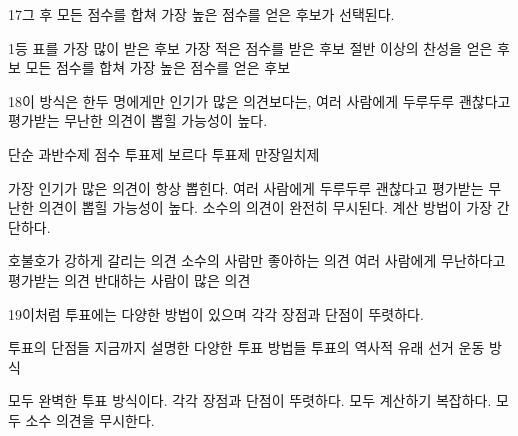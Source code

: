 \documentclass[fs85,seriesRus]{korfarm-base}
\begin{document}
\begin{kfSentenceUnit}{17}{그 후 모든 점수를 합쳐 가장 높은 점수를 얻은 후보가 선택된다.}
\begin{kfChoices}
\kfChoice 1등 표를 가장 많이 받은 후보
\kfChoice 가장 적은 점수를 받은 후보
\kfChoice 절반 이상의 찬성을 얻은 후보
\kfChoice 모든 점수를 합쳐 가장 높은 점수를 얻은 후보
\end{kfChoices}
\end{kfSentenceUnit}

\begin{kfSentenceUnit}{18}{이 방식은 한두 명에게만 인기가 많은 의견보다는, 여러 사람에게 두루두루 괜찮다고 평가받는 무난한 의견이 뽑힐 가능성이 높다.}
\begin{kfChoices}
\kfChoice 단순 과반수제
\kfChoice 점수 투표제
\kfChoice 보르다 투표제
\kfChoice 만장일치제
\end{kfChoices}
\begin{kfChoices}
\kfChoice 가장 인기가 많은 의견이 항상 뽑힌다.
\kfChoice 여러 사람에게 두루두루 괜찮다고 평가받는 무난한 의견이 뽑힐 가능성이 높다.
\kfChoice 소수의 의견이 완전히 무시된다.
\kfChoice 계산 방법이 가장 간단하다.
\end{kfChoices}
\begin{kfChoices}
\kfChoice 호불호가 강하게 갈리는 의견
\kfChoice 소수의 사람만 좋아하는 의견
\kfChoice 여러 사람에게 무난하다고 평가받는 의견
\kfChoice 반대하는 사람이 많은 의견
\end{kfChoices}
\end{kfSentenceUnit}

\begin{kfSentenceUnit}{19}{이처럼 투표에는 다양한 방법이 있으며 각각 장점과 단점이 뚜렷하다.}
\begin{kfChoices}
\kfChoice 투표의 단점들
\kfChoice 지금까지 설명한 다양한 투표 방법들
\kfChoice 투표의 역사적 유래
\kfChoice 선거 운동 방식
\end{kfChoices}
\begin{kfChoices}
\kfChoice 모두 완벽한 투표 방식이다.
\kfChoice 각각 장점과 단점이 뚜렷하다.
\kfChoice 모두 계산하기 복잡하다.
\kfChoice 모두 소수 의견을 무시한다.
\end{kfChoices}
\end{kfSentenceUnit}
\end{document}
